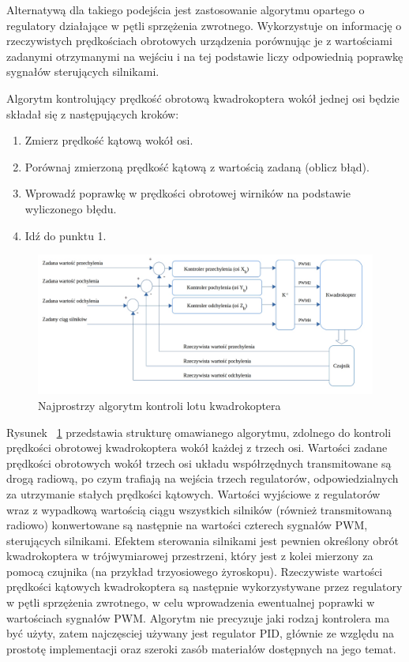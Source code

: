 Alternatywą dla takiego podejścia jest zastosowanie algorytmu opartego o regulatory działające w pętli sprzężenia zwrotnego. Wykorzystuje on informację o rzeczywistych prędkościach obrotowych urządzenia porównując je z wartościami zadanymi otrzymanymi na wejściu i na tej podstawie liczy odpowiednią poprawkę sygnałów sterujących silnikami. 

Algorytm kontrolujący prędkość obrotową kwadrokoptera wokół jednej osi będzie składał się z następujących kroków:

\begin{enumerate}
	\item Zmierz prędkość kątową wokół osi.
	\item Porównaj zmierzoną prędkość kątową z wartością zadaną (oblicz błąd).
	\item Wprowadź poprawkę w prędkości obrotowej wirników na podstawie wyliczonego błędu.
	\item Idź do punktu 1.
\end{enumerate}


\begin{figure}[H]
	\centering
	\includegraphics[width=1.1\textwidth]{Pictures/rate_controll_algorithm2.png}
		\caption[Najprostszy algorytm kontroli lotu kwadrokoptera]{Najprostrzy algorytm kontroli lotu kwadrokoptera}
	\label{fig:rate_controll_algorithm}
\end{figure}

Rysunek ~\ref{fig:rate_controll_algorithm} przedstawia strukturę omawianego algorytmu, zdolnego do kontroli prędkości obrotowej kwadrokoptera wokół każdej z trzech osi. Wartości zadane prędkości obrotowych wokół trzech osi układu współrzędnych transmitowane są drogą radiową, po czym trafiają na wejścia trzech regulatorów, odpowiedzialnych za utrzymanie stałych prędkości kątowych. Wartości wyjściowe z regulatorów wraz z wypadkową wartością ciągu wszystkich silników (również transmitowaną radiowo) konwertowane są następnie na wartości czterech sygnałów PWM, sterujących silnikami. Efektem sterowania silnikami jest pewnien określony obrót kwadrokoptera w trójwymiarowej przestrzeni, który jest z kolei mierzony za pomocą czujnika (na przykład trzyosiowego żyroskopu). Rzeczywiste wartości prędkości kątowych kwadrokoptera są następnie wykorzystywane przez regulatory w pętli sprzężenia zwrotnego, w celu wprowadzenia ewentualnej poprawki w wartościach sygnałów PWM. Algorytm nie precyzuje jaki rodzaj kontrolera ma być użyty, zatem najczęsciej używany jest regulator PID, głównie ze względu na prostotę implementacji oraz szeroki zasób materiałów dostępnych na jego temat.

